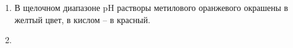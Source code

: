\solutionSection
\begin{enumerate}
\item В щелочном диапазоне pH растворы метилового оранжевого окрашены в желтый цвет, в кислом – в красный.
\item 
\end{enumerate}

